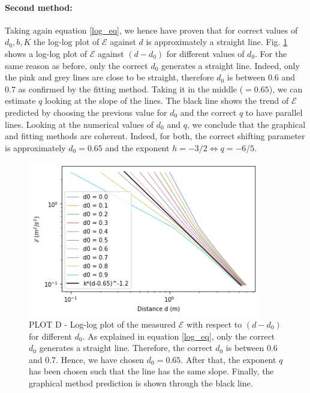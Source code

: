 \documentclass[11pt,titlepage]{article}
\begin{document}
\paragraph{Second method:}
Taking again equation \ref{log_eq}, we hence have proven that for correct values of $d_0,b,K$ the log-log plot of $\mathcal{E}$ against $d$ is approximately a straight line. Fig. \ref{fig6} shows a  log-log plot of $\mathcal{E}$ against $(d-d_0)$ for different values of $d_0$. For the same reason as before, only the correct $d_0$ generates a straight line. Indeed, only the pink and grey lines are close to be straight, therefore $d_0$ is between 0.6 and 0.7 as confirmed by the fitting method. Taking it in the middle ($=0.65$), we can estimate $q$ looking at the slope of the lines. The black line shows the trend of $\mathcal{E}$ predicted by choosing the previous value for $d_0$ and the correct $q$ to have parallel lines. Looking at the numerical values of $d_0$ and $q$, we conclude that the graphical and fitting methods are coherent. Indeed, for both, the correct shifting parameter is approximately $d_0=0.65$ and the exponent $h=-3/2 \Leftrightarrow q = -6/5$. 

	\begin{center} 
	\begin{figure} [h]
		\centering
		\includegraphics[width = 4in]{./figures/ex1_5_2.png}
		\caption{PLOT D - Log-log plot of the measured $\mathcal{E}$ with respect to $(d-d_0)$ for different $d_0$. As explained in equation \ref{log_eq}, only the correct $d_0$ generates a straight line. Therefore, the correct $d_0$ is between 0.6 and 0.7. Hence, we have chosen $d_0=0.65$.  After that, the exponent $q$ has been chosen such that the line has the same slope. Finally, the graphical method prediction is shown through the black line.}
		\label{fig6}
	\end{figure}
\end{center}
\end{document}
